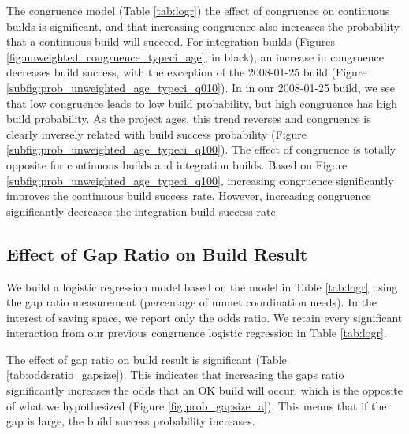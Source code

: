 The congruence model (Table \ref{tab:logr}) the effect of congruence on continuous builds is significant, and that increasing congruence also increases the probability that a continuous build will succeed. 
For integration builds (Figures \ref{fig:unweighted_congruence_typeci_age}, in black), an increase in congruence decreases build success, with the exception of the 2008-01-25 build (Figure \ref{subfig:prob_unweighted_age_typeci_q010}). In in our 2008-01-25 build, we see that low congruence leads to low build probability, but high congruence has high build probability. As the project ages, this trend reverses and congruence is clearly inversely related with build success probability (Figure \ref{subfig:prob_unweighted_age_typeci_q100}).
The effect of congruence is totally opposite for continuous builds and integration builds. Based on Figure \ref{subfig:prob_unweighted_age_typeci_q100}, increasing congruence significantly improves the continuous build success rate. However, increasing congruence significantly decreases the integration build success rate.


\subsection{Effect of Gap Ratio on Build Result}
\label{sec:gapsizeresult}
We build a logistic regression model based on the model in Table \ref{tab:logr} using the gap ratio measurement (percentage of unmet coordination needs). In the interest of saving space, we report only the odds ratio. We retain every significant interaction from our previous congruence logistic regression in Table \ref{tab:logr}.

The effect of gap ratio on build result is significant (Table \ref{tab:oddsratio_gapsize}). This indicates that increasing the gaps ratio significantly increases the odds that an OK build will occur, which is the opposite of what we hypothesized (Figure \ref{fig:prob_gapsize_a}). This means that if the gap is large, the build success probability increases.

